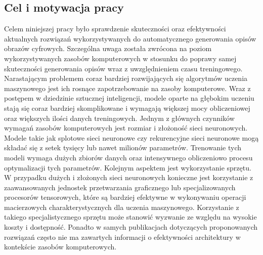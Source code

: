 \subsection{Cel i motywacja pracy}
Celem niniejszej pracy było sprawdzenie skuteczności oraz efektywności aktualnych rozwiązań wykorzystywanych do automatycznego generowania opisów obrazów cyfrowych. Szczególna uwaga została zwrócona na poziom wykorzystywanych zasobów komputerowych w stosunku do poprawy samej skuteczności generowania opisów wraz z uwzględnieniem czasu treningowego. Narastającym problemem coraz bardziej rozwijających się algorytmów uczenia maszynowego jest ich rosnące zapotrzebowanie na zasoby komputerowe. Wraz z postępem w dziedzinie sztucznej inteligencji, modele oparte na głębokim uczeniu stają się coraz bardziej skomplikowane i wymagają większej mocy obliczeniowej oraz większych ilości danych treningowych. Jednym z głównych czynników wymagań zasobów komputerowych jest rozmiar i złożoność sieci neuronowych. Modele takie jak splotowe sieci neuronowe czy rekurencyjne sieci neuronowe mogą składać się z setek tysięcy lub nawet milionów parametrów. Trenowanie tych modeli wymaga dużych zbiorów danych oraz intensywnego obliczeniowo procesu optymalizacji tych parametrów. Kolejnym aspektem jest wykorzystanie sprzętu. W przypadku dużych i złożonych sieci neuronowych konieczne jest korzystanie z zaawansowanych jednostek przetwarzania graficznego lub specjalizowanych procesorów tensorowych, które są bardziej efektywne w wykonywaniu operacji macierzowych charakterystycznych dla uczenia maszynowego. Korzystanie z takiego specjalistycznego sprzętu może stanowić wyzwanie ze względu na wysokie koszty i dostępność. Ponadto w samych publikacjach dotyczących proponowanych rozwiązań często nie ma zawartych informacji o efektywności architektury w kontekście zasobów komputerowych.
